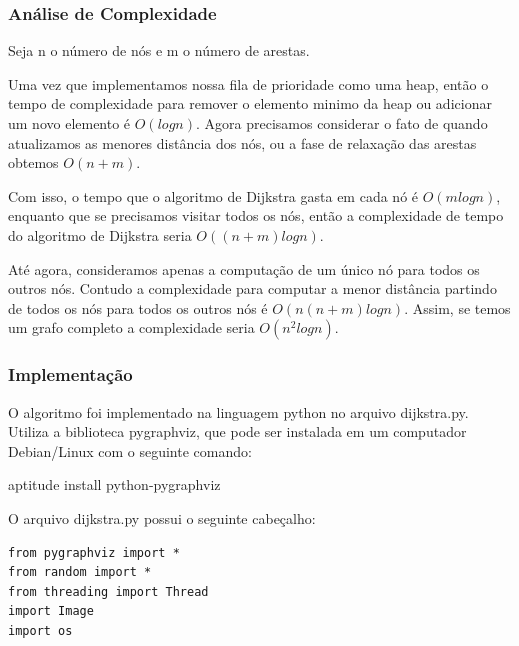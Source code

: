\documentclass[a4paper,12pt]{article}
\begin{document}
\subsubsection{Análise de Complexidade}
Seja n o número de nós e m o número de arestas.

Uma vez que implementamos nossa fila de prioridade como uma heap, então o tempo de complexidade para remover o elemento minimo da heap ou adicionar um novo elemento é \emph{$O(log n)$}.
Agora precisamos considerar o fato de quando atualizamos as menores distância  dos nós, ou a fase de relaxação das arestas obtemos \emph{$O(n+m)$}.

Com isso, o tempo que o algoritmo de Dijkstra gasta em cada nó é \emph{$O(m log n)$}, enquanto que se precisamos visitar todos os nós, então a complexidade de tempo do algoritmo de Dijkstra seria \emph{$O((n+m)log n)$}.

Até agora, consideramos apenas a computação de um único nó para todos os outros nós. Contudo a complexidade para computar a menor distância partindo de todos os nós para todos os outros nós é \emph{$O(n (n+m)log n)$}. Assim, se temos um grafo completo a complexidade seria \emph{$O(n^2 log n)$}.

\subsubsection{Implementação}
O algoritmo foi implementado na linguagem python no arquivo dijkstra.py. Utiliza a biblioteca pygraphviz, que pode ser instalada em um computador Debian/Linux com o seguinte comando:

aptitude install python-pygraphviz

O arquivo dijkstra.py possui o seguinte cabeçalho:
\begin{lstlisting}
from pygraphviz import *
from random import *
from threading import Thread
import Image
import os
\end{lstlisting}
\end{document}
